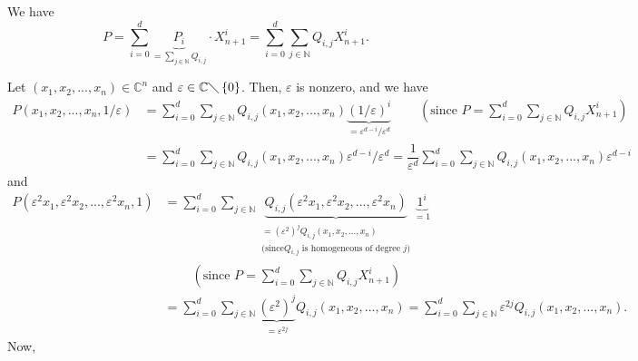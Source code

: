 \documentclass
[numbers=enddot,12pt,final,onecolumn,german,notitlepage]{scrartcl}%
\theoremstyle{definition}
\begin{document}
We have%
\[
P=\sum\limits_{i=0}^{d}\underbrace{P_{i}}_{=\sum\limits_{j\in\mathbb{N}%
}Q_{i,j}}\cdot X_{n+1}^{i}=\sum\limits_{i=0}^{d}\sum\limits_{j\in\mathbb{N}%
}Q_{i,j}X_{n+1}^{i}.
\]


Let $\left(  x_{1},x_{2},...,x_{n}\right)  \in\mathbb{C}^{n}$ and
$\varepsilon\in\mathbb{C}\diagdown\left\{  0\right\}  $. Then, $\varepsilon$
is nonzero, and we have%
\begin{align*}
P\left(  x_{1},x_{2},...,x_{n},1/\varepsilon\right)   &  =\sum\limits_{i=0}%
^{d}\sum\limits_{j\in\mathbb{N}}Q_{i,j}\left(  x_{1},x_{2},...,x_{n}\right)
\underbrace{\left(  1/\varepsilon\right)  ^{i}}_{=\varepsilon^{d-i}%
/\varepsilon^{d}}\ \ \ \ \ \ \ \ \ \ \left(  \text{since }P=\sum
\limits_{i=0}^{d}\sum\limits_{j\in\mathbb{N}}Q_{i,j}X_{n+1}^{i}\right) \\
&  =\sum\limits_{i=0}^{d}\sum\limits_{j\in\mathbb{N}}Q_{i,j}\left(
x_{1},x_{2},...,x_{n}\right)  \varepsilon^{d-i}/\varepsilon^{d}=\dfrac
{1}{\varepsilon^{d}}\sum\limits_{i=0}^{d}\sum\limits_{j\in\mathbb{N}}%
Q_{i,j}\left(  x_{1},x_{2},...,x_{n}\right)  \varepsilon^{d-i}%
\end{align*}
and%
\begin{align*}
P\left(  \varepsilon^{2}x_{1},\varepsilon^{2}x_{2},...,\varepsilon^{2}%
x_{n},1\right)   &  =\sum\limits_{i=0}^{d}\sum\limits_{j\in\mathbb{N}%
}\underbrace{Q_{i,j}\left(  \varepsilon^{2}x_{1},\varepsilon^{2}%
x_{2},...,\varepsilon^{2}x_{n}\right)  }_{\substack{=\left(  \varepsilon
^{2}\right)  ^{j}Q_{i,j}\left(  x_{1},x_{2},...,x_{n}\right)  \\\text{(since
}Q_{i,j}\text{ is homogeneous of degree }j\text{)}}}\underbrace{1^{i}}_{=1}\\
&  \ \ \ \ \ \ \ \ \ \ \left(  \text{since }P=\sum\limits_{i=0}^{d}%
\sum\limits_{j\in\mathbb{N}}Q_{i,j}X_{n+1}^{i}\right) \\
&  =\sum\limits_{i=0}^{d}\sum\limits_{j\in\mathbb{N}}\underbrace{\left(
\varepsilon^{2}\right)  ^{j}}_{=\varepsilon^{2j}}Q_{i,j}\left(  x_{1}%
,x_{2},...,x_{n}\right)  =\sum\limits_{i=0}^{d}\sum\limits_{j\in\mathbb{N}%
}\varepsilon^{2j}Q_{i,j}\left(  x_{1},x_{2},...,x_{n}\right)  .
\end{align*}
Now,%
\end{document}
